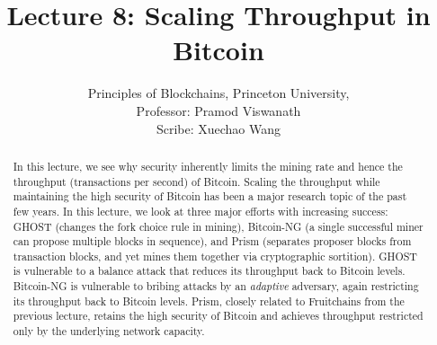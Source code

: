 \documentclass{article}
\title{Lecture 8:  Scaling Throughput in Bitcoin}
\author{Principles of Blockchains, Princeton University,  \\ Professor:  Pramod Viswanath \\ Scribe:  Xuechao Wang}
\begin{document}
\maketitle

\begin{abstract}
In this lecture, we see why security inherently limits the mining rate and hence the throughput (transactions per second) of Bitcoin. Scaling the throughput while maintaining the high security of Bitcoin has been a major research topic of the past few years. In this lecture, we look at three major efforts with increasing success: {\sf GHOST} (changes the fork choice rule in mining), {\sf Bitcoin-NG} (a single successful miner can propose multiple blocks in sequence), and {\sf Prism} (separates proposer blocks from transaction blocks, and yet mines them together via cryptographic sortition). {\sf GHOST} is vulnerable to a balance attack that reduces its throughput back to Bitcoin levels. {\sf Bitcoin-NG} is vulnerable to bribing attacks by an {\em  adaptive} adversary, again restricting its throughput back to Bitcoin levels. {\sf Prism}, closely related to {\sf Fruitchains} from the previous lecture, retains the high security of Bitcoin and achieves throughput restricted only by the underlying network capacity. 
\end{abstract}
\end{document}
